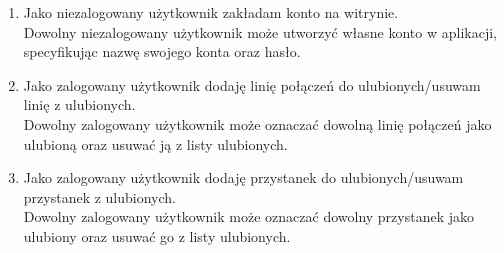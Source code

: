 \documentclass[10pt,a4paper]{article}
\begin{document}
\begin{enumerate}
\begin{enumerate}[label*=\arabic*.]
\begin{enumerate}[label*=\arabic*.]
		 	\item Jako niezalogowany użytkownik zakładam konto na witrynie. \\
			    Dowolny niezalogowany użytkownik może utworzyć własne konto w aplikacji, specyfikując nazwę swojego konta oraz hasło.
		 	\item Jako zalogowany użytkownik dodaję linię połączeń do ulubionych/usuwam linię z ulubionych. \\
			    Dowolny zalogowany użytkownik może oznaczać dowolną linię połączeń jako ulubioną oraz usuwać ją z listy ulubionych.
		 	\item Jako zalogowany użytkownik dodaję przystanek do ulubionych/usuwam przystanek z ulubionych. \\
			    Dowolny zalogowany użytkownik może oznaczać dowolny przystanek jako ulubiony oraz usuwać go z listy ulubionych.
		\end{enumerate}
	\end{enumerate}
\end{enumerate}
\end{document}
